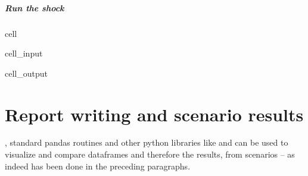 \documentclass[letterpaper,10pt,english]{jupyterBook}
\begin{document}
\paragraph{Run the shock}
\label{\detokenize{content/05_WBModels/ScenarioAnalysis:run-the-shock}}
\begin{sphinxuseclass}{cell}\begin{sphinxVerbatimInput}

\begin{sphinxuseclass}{cell_input}
\begin{sphinxVerbatim}[commandchars=\\\{\}]
  
\PYG{p}{[}\PYG{p}{]}
\end{sphinxVerbatim}

\end{sphinxuseclass}\end{sphinxVerbatimInput}
\begin{sphinxVerbatimOutput}

\begin{sphinxuseclass}{cell_output}
\noindent{}

\end{sphinxuseclass}\end{sphinxVerbatimOutput}

\end{sphinxuseclass}

\chapter{Report writing and scenario results}
\label{\detokenize{content/05_WBModels/ScenarioAnalysis:report-writing-and-scenario-results}}
\sphinxAtStartPar
{}, standard pandas routines and other python libraries like  and  can be used to visualize and compare dataframes and therefore the results, from scenarios – as indeed has been done in the preceding paragraphs.
\end{document}
